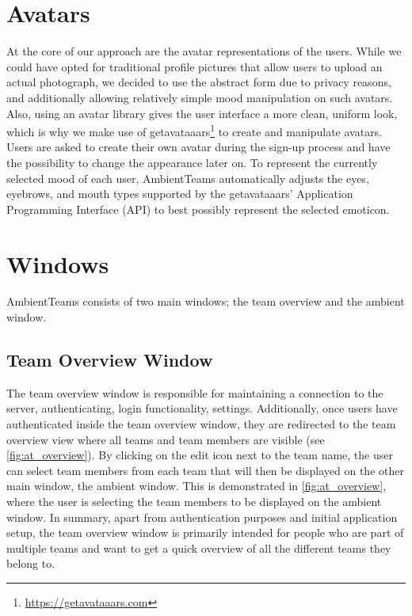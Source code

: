 \section{Avatars}
At the core of our approach are the avatar representations of the users. While we could have opted for traditional profile pictures that allow users to upload an actual photograph, we decided to use the abstract form due to privacy reasons, and additionally allowing relatively simple mood manipulation on such avatars. Also, using an avatar library gives the user interface a more clean, uniform look, which is why we make use of getavataaars\footnote{\url{https://getavataaars.com}} to create and manipulate avatars. Users are asked to create their own avatar during the sign-up process and have the possibility to change the appearance later on. To represent the currently selected mood of each user, AmbientTeams automatically adjusts the eyes, eyebrows, and mouth types supported by the getavataaars' Application Programming Interface (API) to best possibly represent the selected emoticon.

\section{Windows}
AmbientTeams consists of two main windows; the team overview and the ambient window.

\subsection{Team Overview Window}
The team overview window is responsible for maintaining a connection to the server, authenticating, login functionality, settings. Additionally, once users have authenticated inside the team overview window, they are redirected to the team overview view where all teams and team members are visible (see \autoref{fig:at_overview}). By clicking on the edit icon next to the team name, the user can select team members from each team that will then be displayed on the other main window, the ambient window. This is demonstrated in \autoref{fig:at_overview}, where the user is selecting the team members to be displayed on the ambient window. In summary, apart from authentication purposes and initial application setup, the team overview window is primarily intended for people who are part of multiple teams and want to get a quick overview of all the different teams they belong to.

